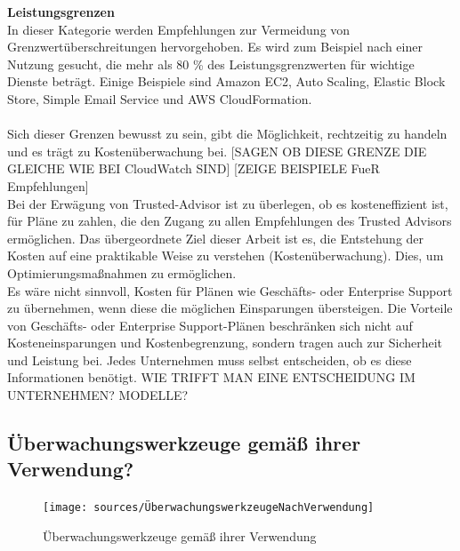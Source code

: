 \textbf{Leistungsgrenzen}\\
In dieser Kategorie werden Empfehlungen zur Vermeidung von Grenzwertüberschreitungen hervorgehoben.
Es wird zum Beispiel nach einer Nutzung gesucht, die mehr als 80 \% des Leistungsgrenzwerten für wichtige Dienste beträgt. Einige Beispiele sind  Amazon EC2, Auto Scaling, Elastic Block Store, Simple Email Service und AWS CloudFormation.
\\\\
Sich dieser Grenzen bewusst zu sein, gibt die Möglichkeit, rechtzeitig zu handeln und es trägt zu Kostenüberwachung bei.
[SAGEN OB DIESE GRENZE DIE GLEICHE WIE BEI CloudWatch SIND]
[ZEIGE BEISPIELE FueR Empfehlungen]\\
Bei der Erwägung von Trusted-Advisor ist zu überlegen, ob es kosteneffizient ist, für Pläne zu zahlen, die den Zugang zu allen Empfehlungen des Trusted Advisors ermöglichen. Das übergeordnete Ziel dieser Arbeit ist es, die Entstehung der Kosten auf eine praktikable Weise zu verstehen (Kostenüberwachung). Dies, um Optimierungsmaßnahmen zu ermöglichen. 
\\
Es wäre nicht sinnvoll, Kosten für Plänen wie Geschäfts- oder Enterprise Support zu übernehmen, wenn diese die möglichen Einsparungen übersteigen.  Die Vorteile von Geschäfts- oder Enterprise Support-Plänen beschränken sich nicht auf Kosteneinsparungen und Kostenbegrenzung, sondern tragen auch zur Sicherheit und Leistung bei. Jedes Unternehmen muss selbst entscheiden, ob es diese Informationen benötigt.
WIE TRIFFT MAN EINE ENTSCHEIDUNG IM UNTERNEHMEN? MODELLE?
\\
\subsection{Überwachungswerkzeuge gemäß ihrer Verwendung?}
\begin{figure}
  \centering
  \texttt{[image: sources/ÜberwachungswerkzeugeNachVerwendung]}
  \caption[Überwachungswerkzeuge gemäß ihrer Verwendung]{}
  \label{fig:ÜberwachungswerkzeugeNachVerwendung} Überwachungswerkzeuge gemäß ihrer Verwendung
\end{figure}

